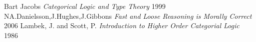 \documentclass[11pt,oneside]{article}
\begin{document}
\begin{thebibliography}{9}
     Bart Jacobs \textit{Categorical Logic and Type Theory} 1999
        NA.Danielsson,J.Hughes,J.Gibbons \textit{Fast and Loose Reasoning is Morally Correct} 2006
     Lambek, J. and Scott, P.  \textit{Introduction to Higher Order Categorial Logic} 1986
\end{thebibliography}
\end{document}
